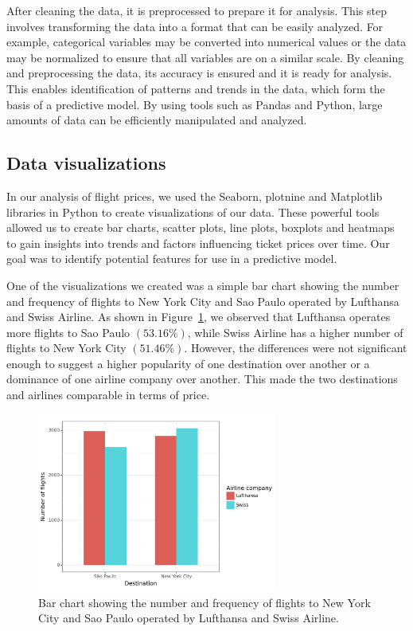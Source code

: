 After cleaning the data, it is preprocessed to prepare it for analysis. This step involves transforming the data into a format that can be easily analyzed.
For example, categorical variables may be converted into numerical values or the data may be normalized to ensure that all variables are on a similar scale.
By cleaning and preprocessing the data, its accuracy is ensured and it is ready for analysis.
This enables identification of patterns and trends in the data, which form the basis of a predictive model.
By using tools such as Pandas and Python, large amounts of data can be efficiently manipulated and analyzed.

\subsection{Data visualizations}
\label{sec:data}

In our analysis of flight prices, we used the Seaborn, plotnine and Matplotlib libraries in Python to create visualizations of our data.
These powerful tools allowed us to create bar charts, scatter plots, line plots, boxplots and heatmaps to gain insights into trends and factors influencing ticket prices over time.
Our goal was to identify potential features for use in a predictive model.

One of the visualizations we created was a simple bar chart showing the number and frequency of flights to New York City and Sao Paulo operated by Lufthansa and Swiss Airline.
As shown in Figure~\ref{fig:bar_pl}, we observed that Lufthansa operates more flights to Sao Paulo $(53.16\%)$, while Swiss Airline has a higher number of flights to New York City $(51.46\%)$.
However, the differences were not significant enough to suggest a higher popularity of one destination over another or a dominance of one airline company over another.
This made the two destinations and airlines comparable in terms of price.
\begin{figure}
    \centering
    \includegraphics[width=0.7\textwidth]{images/1_dest_num_flights.png}
    \caption{Bar chart showing the number and frequency of flights to New York City and Sao Paulo operated by Lufthansa and Swiss Airline.}
    \label{fig:bar_pl}
\end{figure}

